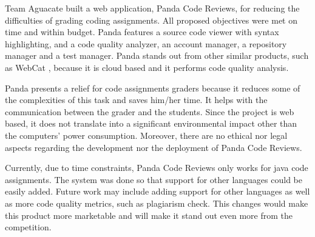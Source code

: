 
Team Aguacate built a web application, Panda Code Reviews, for reducing the difficulties of grading coding assignments. All proposed objectives were met on time and within budget. Panda features a source code viewer with syntax highlighting, and a code quality analyzer, an account manager, a repository manager and a test manager. Panda stands out from other similar products, such as WebCat \cite{WebCat}, because it is cloud based and it performs code quality analysis.

Panda presents a relief for code assignments graders because it reduces some of the complexities of this task and saves him/her time. It helps with the communication between the grader and the students. Since the project is web based, it does not translate into a significant environmental impact other than the computers' power consumption. Moreover, there are no ethical nor legal aspects regarding the development nor the deployment of Panda Code Reviews.

Currently, due to time constraints, Panda Code Reviews only works for java code assignments. The system was done so that support for other languages could be easily added. Future work may include adding support for other languages as well as more code quality metrics, such as plagiarism check. This changes would make this product more marketable and will make it stand out even more from the competition.
